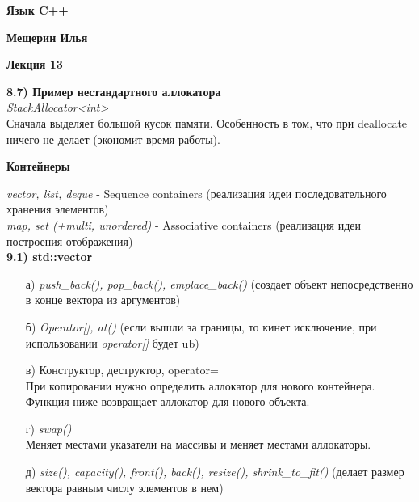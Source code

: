 \documentclass{article}
\begin{document}
	
\begin{center}
	\begin{LARGE}
		\textbf{Язык C++}
	\end{LARGE}
\end{center}
\begin{center}
	\begin{normalsize}
		\textbf{Мещерин Илья}
	\end{normalsize}
\end{center}
\begin{center}
	\begin{Large}
		\textbf{Лекция 13}
	\end{Large}
\end{center}

\noindent \textbf{8.7) Пример нестандартного аллокатора} \\
\textit{StackAllocator<int>} \\
Сначала выделяет большой кусок памяти. Особенность в том, что при deallocate ничего не делает (экономит время работы). 

\begin{center}
	\begin{large}
		\textbf{Контейнеры}
	\end{large}
\end{center}


\noindent \textit{vector, list, deque} - Sequence containers (реализация идеи последовательного хранения элементов)\\
\textit{map, set (+multi, unordered)} - Associative containers (реализация идеи построения отображения)\\
\textbf{9.1) std::vector}
\begin{itemize}

	\item[а)] 
\textit{push\_back(), pop\_back(), emplace\_back()} (создает объект непосредственно в конце вектора из аргументов)
	
	\item[б)]\textit{Operator[], at()} (если вышли за границы, то кинет исключение, при использовании \textit{operator[]} будет ub)

	\item[в)] Конструктор, деструктор, operator=\\
При копировании нужно определить аллокатор для нового контейнера. Функция ниже возвращает аллокатор для нового объекта.

	\item[г)] \textit{swap()}\\
Меняет местами указатели на массивы и меняет местами аллокаторы.
	\item[д)] \textit{size(), capacity(), front(), back(), resize(), shrink\_to\_fit()} (делает размер вектора равным числу элементов в нем)
\end{itemize}
\end{document}

